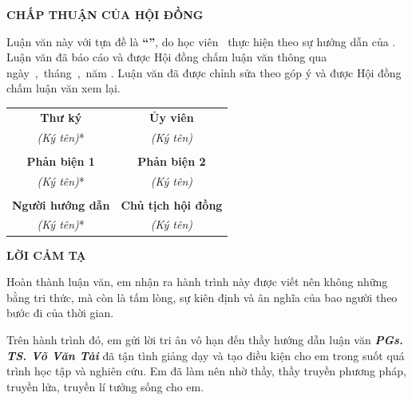 
\begin{center}
	{\fontsize{14}{0pt}\selectfont\bf CHẤP THUẬN CỦA HỘI ĐỒNG}
\end{center}
\vspace{50pt}




Luận văn này với tựa đề là {\bf``\nametitle''}, do học viên \student\, thực hiện theo sự hướng dẫn của \MainAdvisor. Luận văn đã báo cáo và được Hội đồng chấm luận văn thông qua ngày~\quad,~tháng~\quad,~năm \qquad. Luận văn đã được chỉnh sửa theo góp ý và được Hội đồng chấm luận văn xem lại.

\begin{center}
	\begin{tabular*}{.7\columnwidth}{@{\extracolsep\fill}cc@{\extracolsep\fill}} 
		\textbf{Thư ký} & \textbf{Ủy viên}\\
		\textit{(Ký tên)}* & \textit{(Ký tên)}\\
		\vspace{80pt} & \\
		\textbf{Phản biện 1} & \textbf{Phản biện 2}\\
		\textit{(Ký tên)}* & \textit{(Ký tên)}\\
		\vspace{80pt} & \\
		\textbf{Người hướng dẫn} & \textbf{Chủ tịch hội đồng}\\
		\textit{(Ký tên)}* & \textit{(Ký tên)}\\			
	\end{tabular*}
\end{center}

\newpage
	\vspace*{50pt} %
\begin{center}
	{\fontsize{14}{0pt}\selectfont\bf LỜI CẢM TẠ}
\end{center}
\vspace{20pt}


Hoàn thành luận văn, em nhận ra hành trình này được viết nên không những bằng tri thức, mà còn là tấm lòng, sự kiên định và ân nghĩa của bao người theo bước đi của thời gian. 

Trên hành trình đó, em gửi lời tri ân vô hạn đến thầy hướng dẫn luận văn \textit{\textbf{PGs. TS. Võ Văn Tài}} đã tận tình giảng dạy và tạo điều kiện cho em trong suốt quá trình học tập và nghiên cứu. Em đã làm nên nhờ thầy, thầy truyền phương pháp, truyền lửa, truyền lí tưởng sống cho em. 

